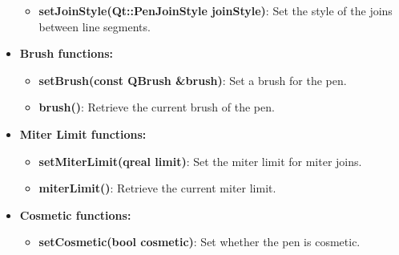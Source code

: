 \documentclass{report}
\begin{document}
\begin{concept}
\begin{itemize}
\begin{itemize}
                    \item \textbf{setJoinStyle(Qt::PenJoinStyle joinStyle)}: Set the style of the joins between line segments.
                \end{itemize}
            \item \textbf{Brush functions:} 
                \begin{itemize}
                    \item \textbf{setBrush(const QBrush \&brush)}: Set a brush for the pen.
                    \item \textbf{brush()}: Retrieve the current brush of the pen.
                \end{itemize}
            \item \textbf{Miter Limit functions:} 
                \begin{itemize}
                    \item \textbf{setMiterLimit(qreal limit)}: Set the miter limit for miter joins.
                    \item \textbf{miterLimit()}: Retrieve the current miter limit.
                \end{itemize}
            \item \textbf{Cosmetic functions:} 
                \begin{itemize}
                    \item \textbf{setCosmetic(bool cosmetic)}: Set whether the pen is cosmetic.
                \end{itemize}
        \end{itemize}
    \end{concept}

    \pagebreak
\end{document}

